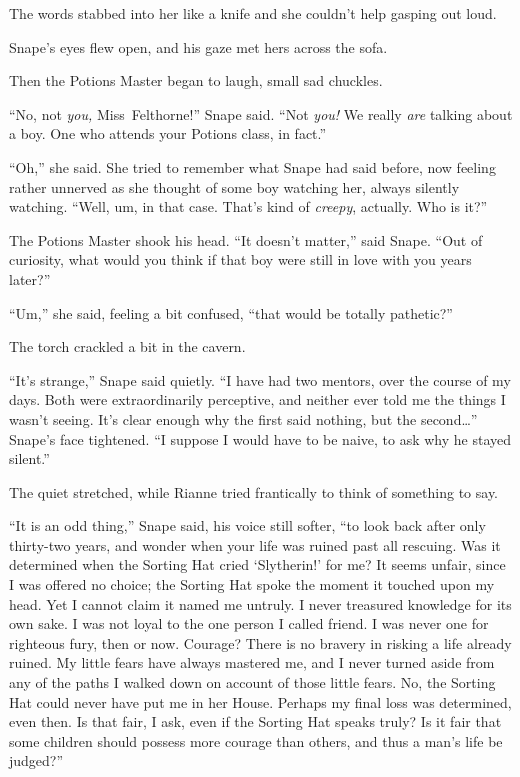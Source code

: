 The words stabbed into her like a knife and she couldn’t help gasping out loud.

Snape’s eyes flew open, and his gaze met hers across the sofa.

Then the Potions Master began to laugh, small sad chuckles.

“No, not \emph{you,} Miss~Felthorne!” Snape said. “Not \emph{you!} We really \emph{are} talking about a boy. One who attends your Potions class, in fact.”

“Oh,” she said. She tried to remember what Snape had said before, now feeling rather unnerved as she thought of some boy watching her, always silently watching. “Well, um, in that case. That’s kind of \emph{creepy}, actually. Who is it?”

The Potions Master shook his head. “It doesn’t matter,” said Snape. “Out of curiosity, what would you think if that boy were still in love with you years later?”

“Um,” she said, feeling a bit confused, “that would be totally pathetic?”

The torch crackled a bit in the cavern.

“It’s strange,” Snape said quietly. “I have had two mentors, over the course of my days. Both were extraordinarily perceptive, and neither ever told me the things I wasn’t seeing. It’s clear enough why the first said nothing, but the second…” Snape’s face tightened. “I suppose I would have to be naive, to ask why he stayed silent.”

The quiet stretched, while Rianne tried frantically to think of something to say.

“It is an odd thing,” Snape said, his voice still softer, “to look back after only thirty-two years, and wonder when your life was ruined past all rescuing. Was it determined when the Sorting Hat cried ‘Slytherin!’ for me? It seems unfair, since I was offered no choice; the Sorting Hat spoke the moment it touched upon my head. Yet I cannot claim it named me untruly. I never treasured knowledge for its own sake. I was not loyal to the one person I called friend. I was never one for righteous fury, then or now. Courage? There is no bravery in risking a life already ruined. My little fears have always mastered me, and I never turned aside from any of the paths I walked down on account of those little fears. No, the Sorting Hat could never have put me in her House. Perhaps my final loss was determined, even then. Is that fair, I ask, even if the Sorting Hat speaks truly? Is it fair that some children should possess more courage than others, and thus a man’s life be judged?”

